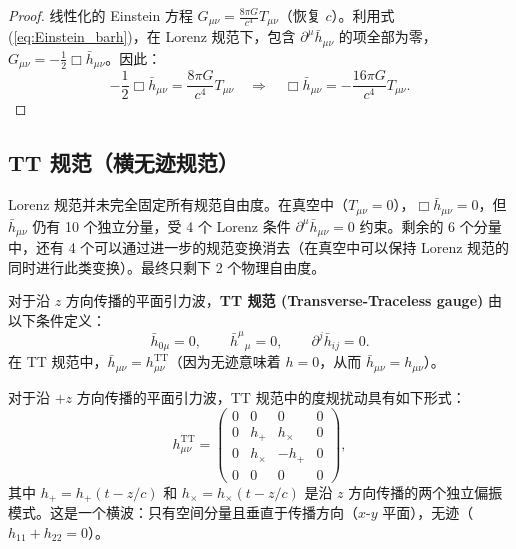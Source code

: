 \begin{proof}
线性化的 Einstein 方程 $G_{\mu\nu} = \frac{8\pi G}{c^4}T_{\mu\nu}$（恢复 $c$）。利用式 (\ref{eq:Einstein_barh})，在 Lorenz 规范下，包含 $\partial^\mu\bar{h}_{\mu\nu}$ 的项全部为零，$G_{\mu\nu} = -\frac{1}{2}\Box\bar{h}_{\mu\nu}$。因此：
\begin{equation}
    -\frac{1}{2}\Box\bar{h}_{\mu\nu} = \frac{8\pi G}{c^4}T_{\mu\nu}
    \quad\Longrightarrow\quad
    \Box\bar{h}_{\mu\nu} = -\frac{16\pi G}{c^4}T_{\mu\nu}.
\end{equation}
\end{proof}

\subsection{TT 规范（横无迹规范）}

Lorenz 规范并未完全固定所有规范自由度。在真空中（$T_{\mu\nu}=0$），$\Box\bar{h}_{\mu\nu}=0$，但 $\bar{h}_{\mu\nu}$ 仍有 10 个独立分量，受 4 个 Lorenz 条件 $\partial^\mu\bar{h}_{\mu\nu}=0$ 约束。剩余的 6 个分量中，还有 4 个可以通过进一步的规范变换消去（在真空中可以保持 Lorenz 规范的同时进行此类变换）。最终只剩下 2 个物理自由度。

\begin{definition}[TT 规范 —— 横无迹规范]
对于沿 $z$ 方向传播的平面引力波，\textbf{TT 规范 (Transverse-Traceless gauge)} 由以下条件定义：
\begin{equation}
    \bar{h}_{0\mu} = 0, \qquad \bar{h}^\mu{}_\mu = 0, \qquad \partial^j \bar{h}_{ij} = 0.
    \label{eq:TT_gauge}
\end{equation}
在 TT 规范中，$\bar{h}_{\mu\nu} = h_{\mu\nu}^{\text{TT}}$（因为无迹意味着 $h=0$，从而 $\bar{h}_{\mu\nu}=h_{\mu\nu}$）。
\end{definition}

对于沿 $+z$ 方向传播的平面引力波，TT 规范中的度规扰动具有如下形式：
\begin{equation}
    h_{\mu\nu}^{\text{TT}} = 
    \begin{pmatrix}
        0 & 0 & 0 & 0 \\
        0 & h_+ & h_\times & 0 \\
        0 & h_\times & -h_+ & 0 \\
        0 & 0 & 0 & 0
    \end{pmatrix},
    \label{eq:TT_matrix}
\end{equation}
其中 $h_+ = h_+(t-z/c)$ 和 $h_\times = h_\times(t-z/c)$ 是沿 $z$ 方向传播的两个独立偏振模式。这是一个横波：只有空间分量且垂直于传播方向（$x$-$y$ 平面），无迹（$h_{11}+h_{22}=0$）。

